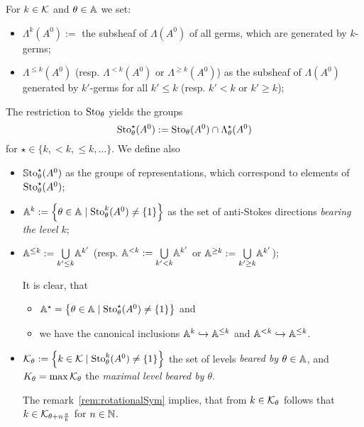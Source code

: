 \begin{notations}
  For $k\in\mathcal{K}$ and $\theta\in\mathbb{A}$ we set:
  \begin{itemize}
    \item $\Lambda^{k}(A^0):=$ the subsheaf of $\Lambda(A^0)$ of all germs,
      which are generated by $k$-germs;
    \item $\Lambda^{\leq k}(A^0)$ (resp. $\Lambda^{<k}(A^0)$ or
      $\Lambda^{\geq k}(A^0)$) as the subsheaf of $\Lambda(A^0)$ generated by
      $k'$-germs for all $k'\leq k$ (resp. $k'<k$ or $k'\geq k$);
  \end{itemize}
  The restriction to $\operatorname{Sto}_\theta$ yields the groups
  \[
    \operatorname{Sto}_\theta^\star(A^0):=\operatorname{Sto}_\theta(A^0)\cap\Lambda_\theta^{\star}(A^0)
  \]
  for $\star\in\{k,<k,\leq k,\dots\}$.
  We define also
  \begin{itemize}
    \item $\operatorname{\mathbb{S}to}^\star_\theta(A^0)$ as the groups of representations, which
      correspond to elements of  $\operatorname{Sto}^\star_\theta(A^0)$;
    \item $\mathbb{A}^k:=\left\{\theta\in\mathbb{A}\mid\operatorname{Sto}_\theta^k(A^0)\neq\{1\}\right\}$ as
      the set of anti-Stokes directions \emph{bearing the level $k$};
    \item $\mathbb{A}^{\leq k}:=\underset{k'\leq k}\bigcup\mathbb{A}^{k'}$ (resp.
      $\mathbb{A}^{<k}:=\underset{k'<k}\bigcup\mathbb{A}^{k'}$ or
      $\mathbb{A}^{\geq k}:=\underset{k'\geq k}\bigcup\mathbb{A}^{k'}$);
      \begin{s-rem}
        It is clear, that
        \begin{itemize}
          \item $\mathbb{A}^{\star}=\left\{\theta\in\mathbb{A}
            \mid\operatorname{Sto}_{\theta}^\star(A^0)\neq\{1\}\right\}$ and
          \item we have the canonical inclusions
            $\mathbb{A}^k\hookrightarrow\mathbb{A}^{\leq k}$ and
            $\mathbb{A}^{<k}\hookrightarrow\mathbb{A}^{\leq k}$.
        \end{itemize}
      \end{s-rem}
    \item $\mathcal{K}_\theta:=\left\{k\in\mathcal{K}\mid\operatorname{Sto}_\theta^k(A^0)\neq\{1\}\right\}$
      the set of levels \emph{beared by $\theta\in\mathbb{A}$}, and
      $K_\theta=\max\mathcal{K}_\theta$ the \emph{maximal level beared by $\theta$}.
      \begin{s-rem}
        The remark~\ref{rem:rotationalSym} implies, that from $k\in\mathcal{K}_{\theta}$
        follows that $k\in\mathcal{K}_{\theta+n\frac{\pi}{k}}$ for $n\in\mathbb{N}$.
      \end{s-rem}
  \end{itemize}
\end{notations}

